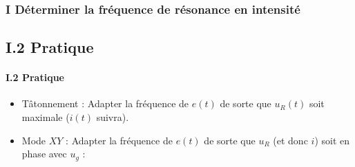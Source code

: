 \documentclass{beamer}
\begin{document}
    \begin{frame}
        \frametitle{I Déterminer la fréquence de résonance en intensité}
        \subsection{I.2 Pratique}
        \framesubtitle{I.2 Pratique}
        \begin{itemize}
            \item Tâtonnement : Adapter la fréquence de $e(t)$ de sorte que $u_R(t)$ soit maximale ($i(t)$ suivra).
            \item Mode $XY$ : Adapter la fréquence de $e(t)$ de sorte que $u_R$ (et donc $i$) soit en phase avec $u_g$ :
        \end{itemize}
        \begin{center}
        \end{center}
    \end{frame}
\end{document}
